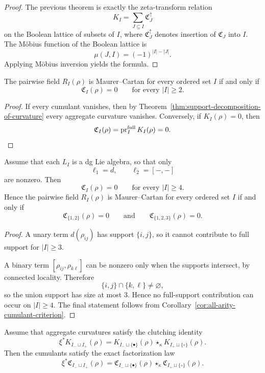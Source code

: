 \begin{proof}
The previous theorem is exactly the zeta-transform relation
\[
K_I=\sum_{J\subseteq I}\mathfrak C_J^\uparrow
\]
on the Boolean lattice of subsets of $I$, where $\mathfrak C_J^\uparrow$ denotes insertion of
$\mathfrak C_J$ into $I$. The M\"obius function of the Boolean lattice is
\[
\mu(J,I)=(-1)^{|I|-|J|}.
\]
Applying M\"obius inversion yields the formula.
\end{proof}

\begin{corollary}
\label{cor:all-arity-cumulant-criterion}
The pairwise field $R_I(\rho)$ is Maurer--Cartan for every ordered set $I$ if and only if
\[
\mathfrak C_I(\rho)=0
\qquad\text{for every }|I|\ge 2.
\]
\end{corollary}

\begin{proof}
If every cumulant vanishes, then by Theorem~\ref{thm:support-decomposition-of-curvature} every
aggregate curvature vanishes. Conversely, if $K_I(\rho)=0$, then
\[
\mathfrak C_I(\rho)=\operatorname{pr}_I^{\mathrm{full}}K_I(\rho)=0.
\]
\end{proof}

\begin{theorem}
\label{thm:strict-collapse-to-two-three}
Assume that each $L_I$ is a dg Lie algebra, so that only
\[
\ell_1=d,
\qquad
\ell_2=[-,-]
\]
are nonzero. Then
\[
\mathfrak C_I(\rho)=0
\qquad\text{for every }|I|\ge 4.
\]
Hence the pairwise field $R_I(\rho)$ is Maurer--Cartan for every ordered set $I$ if and only if
\[
\mathfrak C_{\{1,2\}}(\rho)=0
\qquad\text{and}\qquad
\mathfrak C_{\{1,2,3\}}(\rho)=0.
\]
\end{theorem}

\begin{proof}
A unary term $d(\rho_{ij})$ has support $\{i,j\}$, so it cannot contribute to full support for
$|I|\ge 3$.

A binary term $[\rho_{ij},\rho_{k\ell}]$ can be nonzero only when the supports intersect, by
connected locality. Therefore
\[
\{i,j\}\cap\{k,\ell\}\neq\varnothing,
\]
so the union support has size at most $3$. Hence no full-support contribution can occur on
$|I|\ge 4$.
The final statement follows from Corollary~\ref{cor:all-arity-cumulant-criterion}.
\end{proof}

\begin{theorem}
\label{thm:clutching-factorization-of-cumulants}
Assume that aggregate curvatures satisfy the clutching identity
\[
\xi^*K_{I_-\sqcup I_+}(\rho)
=
K_{I_-\sqcup\{\bullet\}}(\rho)\star_\kappa
K_{I_+\sqcup\{\circ\}}(\rho).
\]
Then the cumulants satisfy the exact factorization law
\[
\xi^*\mathfrak C_{I_-\sqcup I_+}(\rho)
=
\mathfrak C_{I_-\sqcup\{\bullet\}}(\rho)\star_\kappa
\mathfrak C_{I_+\sqcup\{\circ\}}(\rho).
\]
\end{theorem}

